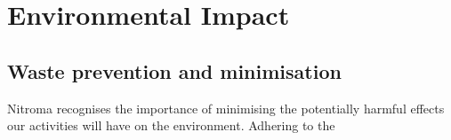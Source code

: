 \section{Environmental Impact}

\subsection{Waste prevention and minimisation }

Nitroma recognises the importance of minimising the potentially harmful effects our activities will have on the environment. Adhering to the  